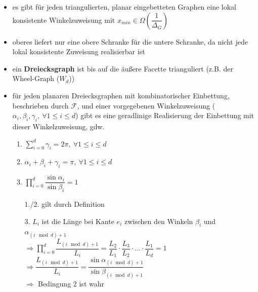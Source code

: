 \topbreak
\vspace*{-2\baselineskip}
\begin{itemize}[itemsep=-1pt]
	\item es gibt für jeden triangulierten, planar eingebetteten Graphen eine lokal konsistente Winkelzuweisung mit $x_{min}\in\Omega(\dfrac{1}{\Delta_G})$
	\item oberes liefert nur eine obere Schranke für die untere Schranke, da nicht jede lokal konsistente Zuweisung realisierbar ist
	\item ein \textbf{Dreiecksgraph} ist bis auf die äußere Facette trianguliert (z.B. der Wheel-Graph ($W_d$))
	\item für jeden planaren Dreiecksgraphen mit kombinatorischer Einbettung, beschrieben durch $\mathcal{F}$, und einer vorgegebenen Winkelzuweisung ($\alpha_i,\beta_i,\gamma_i,~\forall 1\leq i\leq d$) gibt es eine geradlinige Realisierung der Einbettung mit dieser Winkelzuweisung, gdw.
		\begin{enumerate}[itemsep=-1pt]
			\item $\sum\limits_{i=0}^{d}\gamma_i=2\pi,~\forall 1\leq i\leq d$
			\item $\alpha_i+\beta_i+\gamma_i=\pi,~\forall 1\leq i\leq d$
			\item $\prod\limits_{i=0}^{d}\dfrac{\sin\alpha_i}{\sin\beta_i}=1$
		\end{enumerate}
	\vspace*{-\baselineskip}
	\ProofOne{$\Rightarrow$}
	\vspace*{-0.5\baselineskip}
	\begin{enumerate}[itemsep=-1pt]
		\item[1./2.] gilt durch Definition
		\item[3.] $L_i$ ist die Länge bei Kante $e_i$ zwischen den Winkeln $\beta_i$ und $\alpha_{(i\mod d)+1}$\\
		$\Rightarrow \prod\limits_{i=0}^{d}\dfrac{L_{(i\mod d)+1}}{L_i}=\dfrac{L_2}{L_1}\cdot \dfrac{L_3}{L_2}\cdot \ldots\cdot \dfrac{L_1}{L_d}=1$\\
		$\Rightarrow \dfrac{L_{(i\mod d)+1}}{L_i}=\dfrac{\sin \alpha_{(i\mod d)+1}}{\sin \beta_{(i\mod d)+1}}$\\
		$\Rightarrow$ Bedingung 2 ist wahr
	\end{enumerate}
	\vspace*{-\baselineskip}
	\vspace*{-0.5\baselineskip}
	\begin{itemize}[itemsep=-1pt]

\end{itemize}
\end{itemize}
